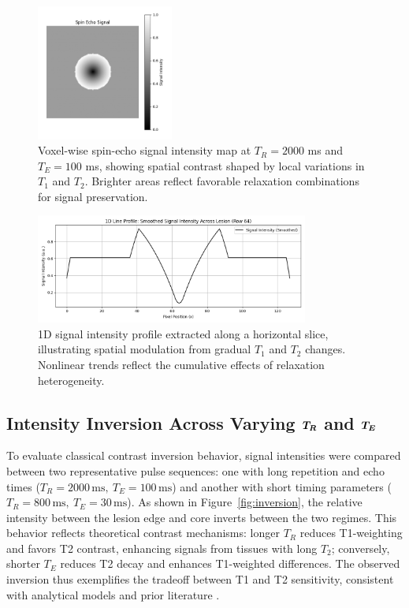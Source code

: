 \documentclass[10pt,a4paper,twoside]{article}
\begin{document}
\begin{figure}[htbp!]
\centering
\includegraphics[width=0.4\textwidth]{signalintensitymap.png}
\caption{Voxel-wise spin-echo signal intensity map at $T_R = 2000$ ms and $T_E = 100$ ms, showing spatial contrast shaped by local variations in $T_1$ and $T_2$. Brighter areas reflect favorable relaxation combinations for signal preservation.}
\label{fig:signalmap}
\end{figure}

\begin{figure}[htbp!]
\centering
\includegraphics[width=0.8\textwidth]{1Dlineprofilesignal.png}
\caption{1D signal intensity profile extracted along a horizontal slice, illustrating spatial modulation from gradual $T_1$ and $T_2$ changes. Nonlinear trends reflect the cumulative effects of relaxation heterogeneity.}
\label{fig:lineprofile}
\end{figure}

\subsection{Intensity Inversion Across Varying $\vb*{T_R}$ and $\vb*{T_E}$}

To evaluate classical contrast inversion behavior, signal intensities were compared between two representative pulse sequences: one with long repetition and echo times (\( T_R = 2000 \, \mathrm{ms},\ T_E = 100 \, \mathrm{ms} \)) and another with short timing parameters (\( T_R = 800 \, \mathrm{ms},\ T_E = 30 \, \mathrm{ms} \)). As shown in Figure~\ref{fig:inversion}, the relative intensity between the lesion edge and core inverts between the two regimes. This behavior reflects theoretical contrast mechanisms: longer \( T_R \) reduces T1-weighting and favors T2 contrast, enhancing signals from tissues with long \( T_2 \); conversely, shorter \( T_E \) reduces T2 decay and enhances T1-weighted differences. The observed inversion thus exemplifies the tradeoff between T1 and T2 sensitivity, consistent with analytical models and prior literature \cite{brown2014}.
\end{document}
